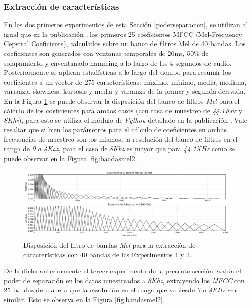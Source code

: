\documentclass{article}
\begin{document}
\subsubsection{Extracción de características}
\label{extcar}
En los dos primeros experimentos de esta Sección \ref{poderseparacion}, se utilizan al igual que en la publicación \cite{Salamon:UrbanSound:ACMMM:14}, los primeros 25 coeficientes MFCC (Mel-Frequency Cepstral Coeficients), calculados sobre un banco de filtros Mel de 40 bandas. Los coeficientes son generados con ventanas temporales de 20ms, 50\% de solapamiento y enventanado hamming a lo largo de los 4 segundos de audio. Posteriormente se aplican estadísticas a lo largo del tiempo para resumir los coeficientes a un vector de 275 características: máximo, mínimo, media, mediana, varianza, skewness, kurtosis y media y varianza de la primer y segunda derivada. En la Figura \ref{fig:bandasmel1} se puede observar la disposición del banco de filtros \textit{Mel} para el cálculo de los coeficientes para ambos casos (con tasa de muestreo de \textit{44.1Khz} y \textit{8Khz}), para esto se utiliza el módulo de \textit{Python} detallado en la publicación \cite{mcfee2015librosa}. Vale resaltar que si bien los parámetros para el cálculo de coeficientes en ambas frecuencias de muestreo son los mismos, la resolución del banco de filtros en el rango de \textit{0 a 4Khz}, para el caso de \textit{8Khz} es mayor que para \textit{44.1KHz} como se puede observar en la Figura \ref{fig:bandasmel2}.

\begin{figure}[h]
\begin{center}
\includegraphics[width=1\textwidth]{bandasmel1} 
\caption{Disposición del filtro de bandas \textit{Mel} para la extracción de características con 40 bandas de los Experimentos 1 y 2. }
\label{fig:bandasmel1}
\end{center}
\end{figure}

De lo dicho anteriormente el tercer experimento de la presente sección evalúa el poder de separación en los datos muestreados a \textit{8Khz}, extrayendo los \textit{MFCC} con 25 bandas de manera que la resolución en el rango que va desde \textit{0 a 4KHz} sea similar. Esto se observa en la Figura \ref{fig:bandasmel2}.
\end{document}
